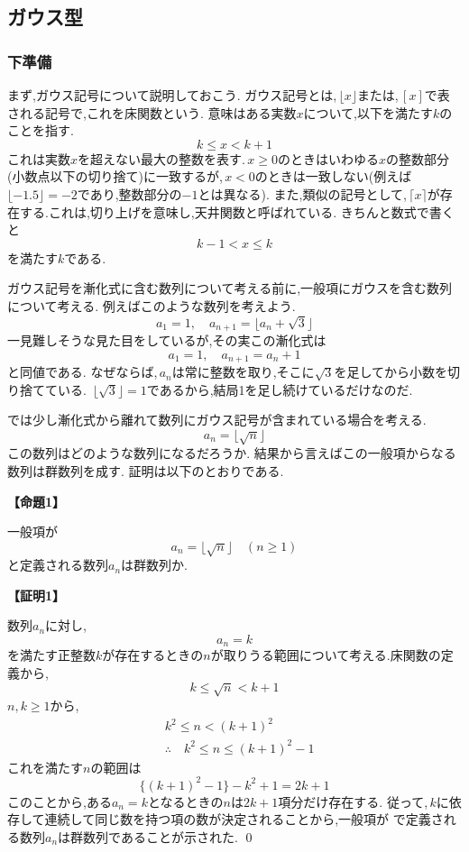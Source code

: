 \subsection{ガウス型}
  \subsubsection{下準備}
    まず,ガウス記号について説明しておこう.
    ガウス記号とは,\,$\lfloor x \rfloor$または,\,$[x]$で表される記号で,これを床関数という.
    意味はある実数$x$について,以下を満たす$k$のことを指す.
    \[
      k \le x < k+1
    \]
    これは実数$x$を超えない最大の整数を表す.\,$x\ge0$のときはいわゆる$x$の整数部分(小数点以下の切り捨て)に一致するが,\,$x<0$のときは一致しない(例えば$\lfloor-1.5\rfloor=-2$であり,整数部分の$-1$とは異なる).
    また,類似の記号として,\,$\lceil x \rceil$が存在する.これは,切り上げを意味し,天井関数と呼ばれている.
    きちんと数式で書くと
    \[
      k-1 < x \le k
    \]
    を満たす$k$である.

    ガウス記号を漸化式に含む数列について考える前に,一般項にガウスを含む数列について考える.
    例えばこのような数列を考えよう.
    \[
      a_1=1,\quad a_{n+1}=\lfloor a_n+\sqrt{3} \rfloor
    \]
    一見難しそうな見た目をしているが,その実この漸化式は
    \[
      a_1=1,\quad a_{n+1}=a_n+1
    \]
    と同値である.
    なぜならば,\,$a_n$は常に整数を取り,そこに$\sqrt{3}$を足してから小数を切り捨てている.
    \,$\lfloor\sqrt3\rfloor=1$であるから,結局1を足し続けているだけなのだ.

    では少し漸化式から離れて数列にガウス記号が含まれている場合を考える.
    \[
      a_{n}=\lfloor \sqrt{n} \rfloor
    \]
    この数列はどのような数列になるだろうか.
    結果から言えばこの一般項からなる数列は群数列を成す.
    証明は以下のとおりである.

    \noindent \textbf{【命題1】}
    \begin{smallquote}
      一般項が
      \[
        a_n=\lfloor \sqrt{n} \rfloor\quad(n\ge1)
      \]
      と定義される数列$a_n$は群数列か.
    \end{smallquote}
    \noindent \textbf{【証明1】}
    \begin{smallquote}
      数列$a_n$に対し,
      \[
        a_n=k
      \]
      を満たす正整数$k$が存在するときの$n$が取りうる範囲について考える.床関数の定義から,
      \[
        k\le\sqrt{n}<k+1
      \]
      $n,k\ge1$から,
      \begin{align*}
          & k^2\le n <(k+1)^2                      \\
          & \therefore\quad k^2\le n \le (k+1)^2-1
      \end{align*}
      これを満たす$n$の範囲は
      \[
        \{(k+1)^2-1\}-k^2+1=2k+1
      \]
      このことから,ある$a_n=k$となるときの$n$は$2k+1$項分だけ存在する.
      従って,\,$k$に依存して連続して同じ数を持つ項の数が決定されることから,一般項が
      で定義される数列$a_n$は群数列であることが示された. \qed
    \end{smallquote}

